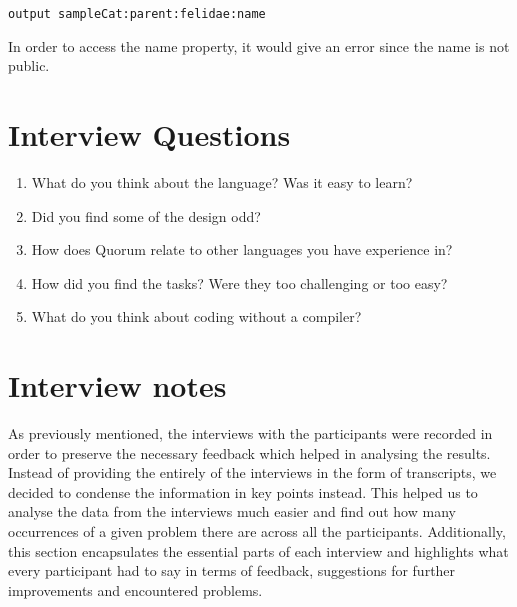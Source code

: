 \begin{lstlisting}[language=Quorum]
output sampleCat:parent:felidae:name
\end{lstlisting}

In order to access the name property, it would give an error since the name is not public.

\chapter{Interview Questions}
\label{chapter:InterviewQuestions}
\begin{enumerate}
\item What do you think about the language? Was it easy to learn?
\item Did you find some of the design odd?
\item How does Quorum relate to other languages you have experience in?
\item How did you find the tasks? Were they too challenging or too easy?
\item What do you think about coding without a compiler?
\end{enumerate}	

\chapter{Interview notes}
\label{chapter:Interview notes}
As previously mentioned, the interviews with the participants were recorded in order to preserve the necessary feedback which helped in analysing the results. Instead of providing the entirely of the interviews in the form of transcripts, we decided to condense the information in key points instead. This helped us to analyse the data from the interviews much easier and find out how many occurrences of a given problem there are across all the participants. Additionally, this section encapsulates the essential parts of each interview and highlights what every participant had to say in terms of feedback, suggestions for further improvements and encountered problems.
